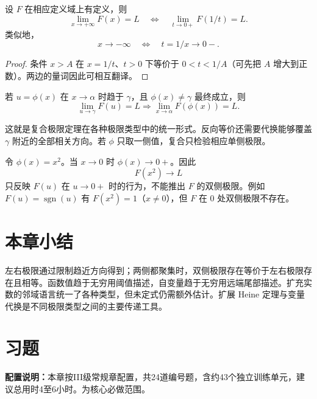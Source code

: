 \begin{proposition}[倒数代换]
设 \(F\) 在相应定义域上有定义，则
\[
 \lim_{x\to+\infty}F(x)=L
 \quad\Longleftrightarrow\quad
 \lim_{t\to0+}F(1/t)=L.
\]
类似地，
\[
 x\to-\infty\quad\Longleftrightarrow\quad t=1/x\to0-.
\]
\end{proposition}

\begin{proof}
条件 \(x>A\) 在 \(x=1/t\)、\(t>0\) 下等价于 \(0<t<1/A\)（可先把 \(A\) 增大到正数）。两边的量词因此可相互翻译。
\end{proof}

\begin{proposition}[平移与尺度代换]
若 \(u=\phi(x)\) 在 \(x\to\alpha\) 时趋于 \(\gamma\)，且 \(\phi(x)\ne\gamma\) 最终成立，则
\[
 \lim_{u\to\gamma}F(u)=L
 \Longrightarrow
 \lim_{x\to\alpha}F(\phi(x))=L.
\]
\end{proposition}

这就是复合极限定理在各种极限类型中的统一形式。反向等价还需要代换能够覆盖 \(\gamma\) 附近的全部相关方向。若 \(\phi\) 只取一侧值，复合只检验相应单侧极限。

\begin{counterexample}
令 \(\phi(x)=x^2\)。当 \(x\to0\) 时 \(\phi(x)\to0+\)。因此
\[
 F(x^2)\to L
\]
只反映 \(F(u)\) 在 \(u\to0+\) 时的行为，不能推出 \(F\) 的双侧极限。例如 \(F(u)=\operatorname{sgn}(u)\) 有 \(F(x^2)=1\)（\(x\ne0\)），但 \(F\) 在 \(0\) 处双侧极限不存在。
\end{counterexample}

\section*{本章小结}

左右极限通过限制趋近方向得到；两侧都聚集时，双侧极限存在等价于左右极限存在且相等。函数值趋于无穷用阈值描述，自变量趋于无穷用远端尾部描述。扩充实数的邻域语言统一了各种类型，但未定式仍需额外估计。扩展 Heine 定理与变量代换是不同极限类型之间的主要传递工具。

\section*{习题}

\noindent\textbf{配置说明：}本章按III级常规章配置，共24道编号题，含约43个独立训练单元，建议总用时4至6小时。为核心必做范围。

